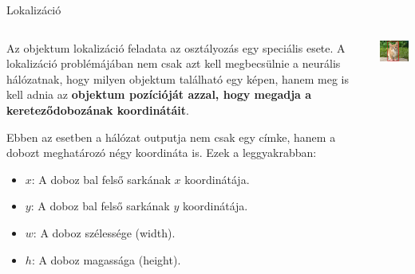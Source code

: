 \documentclass[english, aspectratio=169]{beamer}
\begin{document}
\begin{frame}{Lokalizáció}
\begin{columns}
\begin{column}{.7\textwidth}
Az objektum lokalizáció feladata az osztályozás egy speciális esete. A lokalizáció problémájában nem csak azt kell megbecsülnie a neurális hálózatnak, hogy milyen objektum található egy képen, hanem meg is kell adnia az \textbf{objektum pozícióját azzal, hogy megadja a kereteződobozának koordinátáit}.\par\smallskip
Ebben az esetben a hálózat outputja nem csak egy címke, hanem a dobozt meghatározó négy koordináta is. Ezek a leggyakrabban:
\begin{itemize}
	\item $x$: A doboz bal felső sarkának $x$ koordinátája.
	\item $y$: A doboz bal felső sarkának $y$ koordinátája.
	\item $w$: A doboz szélessége (width).
	\item $h$: A doboz magassága (height).
\end{itemize}
\end{column}
\begin{column}{.3\textwidth}
\begin{center}
\includegraphics[width=4cm, keepaspectratio]{images/od_2.png}
\end{center}
\end{column}
\end{columns}
\end{frame}
\end{document}
